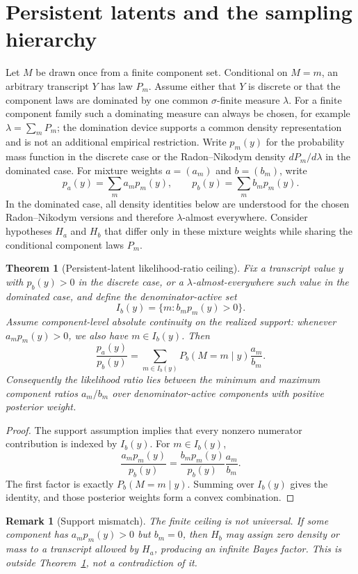 \documentclass[11pt]{article}
\newtheorem{theorem}{Theorem}
\newtheorem{remark}{Remark}
\begin{document}
\section{Persistent latents and the sampling hierarchy}
Let $M$ be drawn once from a finite component set. Conditional on $M=m$, an arbitrary transcript $Y$ has law $P_m$. Assume either that $Y$ is discrete or that the component laws are dominated by one common $\sigma$-finite measure $\lambda$. For a finite component family such a dominating measure can always be chosen, for example $\lambda=\sum_m P_m$; the domination device supports a common density representation and is not an additional empirical restriction. Write $p_m(y)$ for the probability mass function in the discrete case or the Radon--Nikodym density $dP_m/d\lambda$ in the dominated case. For mixture weights $a=(a_m)$ and $b=(b_m)$, write
\[
p_a(y)=\sum_m a_mp_m(y),\qquad p_b(y)=\sum_m b_mp_m(y).
\]
In the dominated case, all density identities below are understood for the chosen Radon--Nikodym versions and therefore $\lambda$-almost everywhere. Consider hypotheses $H_a$ and $H_b$ that differ only in these mixture weights while sharing the conditional component laws $P_m$.

\begin{theorem}[Persistent-latent likelihood-ratio ceiling]\label{thm:persist}
Fix a transcript value $y$ with $p_b(y)>0$ in the discrete case, or a $\lambda$-almost-everywhere such value in the dominated case, and define the denominator-active set
\[
I_b(y)=\{m:b_mp_m(y)>0\}.
\]
Assume component-level absolute continuity on the realized support: whenever $a_mp_m(y)>0$, we also have $m\in I_b(y)$. Then
\[
\frac{p_a(y)}{p_b(y)}
=\sum_{m\in I_b(y)} P_b(M=m\mid y)\frac{a_m}{b_m}.
\]
Consequently the likelihood ratio lies between the minimum and maximum component ratios $a_m/b_m$ over denominator-active components with positive posterior weight.
\end{theorem}

\begin{proof}
The support assumption implies that every nonzero numerator contribution is indexed by $I_b(y)$. For $m\in I_b(y)$,
\[
\frac{a_mp_m(y)}{p_b(y)}
=\frac{b_mp_m(y)}{p_b(y)}\frac{a_m}{b_m}.
\]
The first factor is exactly $P_b(M=m\mid y)$. Summing over $I_b(y)$ gives the identity, and those posterior weights form a convex combination.
\end{proof}

\begin{remark}[Support mismatch]
The finite ceiling is not universal. If some component has $a_mp_m(y)>0$ but $b_m=0$, then $H_b$ may assign zero density or mass to a transcript allowed by $H_a$, producing an infinite Bayes factor. This is outside Theorem~\ref{thm:persist}, not a contradiction of it.
\end{remark}
\end{document}

